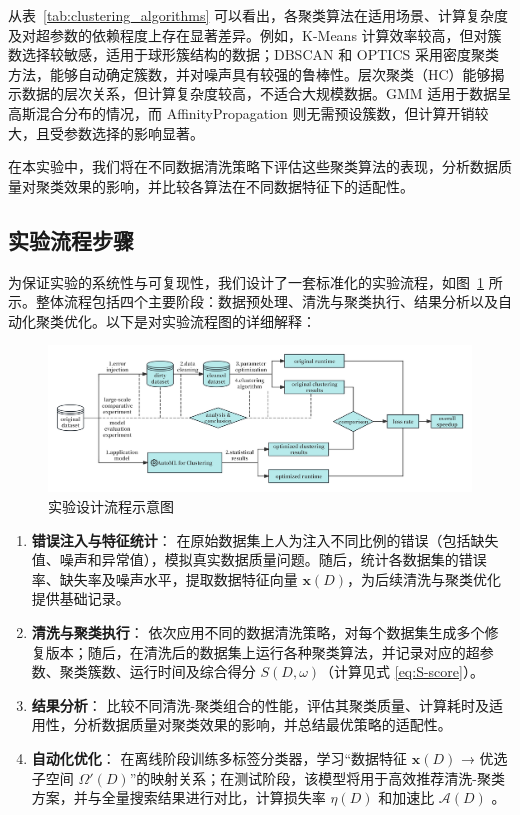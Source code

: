 \documentclass[10pt]{article} %
\numberwithin{equation}{section}
\begin{document}
\noindent
从表~\ref{tab:clustering_algorithms} 可以看出，各聚类算法在适用场景、计算复杂度及对超参数的依赖程度上存在显著差异。例如，K-Means 计算效率较高，但对簇数选择较敏感，适用于球形簇结构的数据；DBSCAN 和 OPTICS 采用密度聚类方法，能够自动确定簇数，并对噪声具有较强的鲁棒性。层次聚类（HC）能够揭示数据的层次关系，但计算复杂度较高，不适合大规模数据。GMM 适用于数据呈高斯混合分布的情况，而 AffinityPropagation 则无需预设簇数，但计算开销较大，且受参数选择的影响显著。

在本实验中，我们将在不同数据清洗策略下评估这些聚类算法的表现，分析数据质量对聚类效果的影响，并比较各算法在不同数据特征下的适配性。

\vspace{1em}
\subsection{实验流程步骤}
\label{sec:exp_flow}

为保证实验的系统性与可复现性，我们设计了一套标准化的实验流程，如图~\ref{fig:exp_workflow} 所示。整体流程包括四个主要阶段：数据预处理、清洗与聚类执行、结果分析以及自动化聚类优化。以下是对实验流程图的详细解释：

\begin{figure}[htbp]
    \centering
    \includegraphics[width=1.0\linewidth]{figures/exp_workflow.png}
    \caption{实验设计流程示意图}
    \label{fig:exp_workflow}
\end{figure}

\begin{enumerate}
    \item \textbf{错误注入与特征统计}：  
    在原始数据集上人为注入不同比例的错误（包括缺失值、噪声和异常值），模拟真实数据质量问题。随后，统计各数据集的错误率、缺失率及噪声水平，提取数据特征向量 \(\mathbf{x}(D)\)，为后续清洗与聚类优化提供基础记录。

    \item \textbf{清洗与聚类执行}：  
    依次应用不同的数据清洗策略，对每个数据集生成多个修复版本；随后，在清洗后的数据集上运行各种聚类算法，并记录对应的超参数、聚类簇数、运行时间及综合得分 \(S(D,\omega)\)（计算见式 \eqref{eq:S-score}）。

    \item \textbf{结果分析}：  
    比较不同清洗-聚类组合的性能，评估其聚类质量、计算耗时及适用性，分析数据质量对聚类效果的影响，并总结最优策略的适配性。

    \item \textbf{自动化优化}：  
    在离线阶段训练多标签分类器，学习“数据特征 \(\mathbf{x}(D)\) → 优选子空间 \(\Omega'(D)\)”的映射关系；在测试阶段，该模型将用于高效推荐清洗-聚类方案，并与全量搜索结果进行对比，计算损失率 \(\eta(D)\) 和加速比 \(\mathcal{A}(D)\) 。
\end{enumerate}
\end{document}
